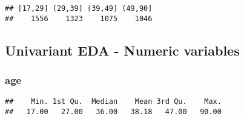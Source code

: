 \documentclass[12pt,]{article}
\newenvironment{Shaded}{\begin{snugshade}}{\end{snugshade}}
\newcommand{\CommentTok}[1]{\textcolor[rgb]{0.56,0.35,0.01}{\textit{#1}}}
\newcommand{\DataTypeTok}[1]{\textcolor[rgb]{0.13,0.29,0.53}{#1}}
\newcommand{\DecValTok}[1]{\textcolor[rgb]{0.00,0.00,0.81}{#1}}
\newcommand{\KeywordTok}[1]{\textcolor[rgb]{0.13,0.29,0.53}{\textbf{#1}}}
\newcommand{\NormalTok}[1]{#1}
\newcommand{\OperatorTok}[1]{\textcolor[rgb]{0.81,0.36,0.00}{\textbf{#1}}}
\newcommand{\StringTok}[1]{\textcolor[rgb]{0.31,0.60,0.02}{#1}}
\begin{document}
\begin{Shaded}
\end{Shaded}

\begin{verbatim}
## [17,29] (29,39] (39,49] (49,90] 
##    1556    1323    1075    1046
\end{verbatim}

\begin{Shaded}
\end{Shaded}

\hypertarget{univariant-eda---numeric-variables}{%
\subsection{Univariant EDA - Numeric
variables}\label{univariant-eda---numeric-variables}}

\hypertarget{age-1}{%
\subsubsection{age}\label{age-1}}

\begin{Shaded}
\end{Shaded}

\begin{verbatim}
##    Min. 1st Qu.  Median    Mean 3rd Qu.    Max. 
##   17.00   27.00   36.00   38.18   47.00   90.00
\end{verbatim}
\end{document}
